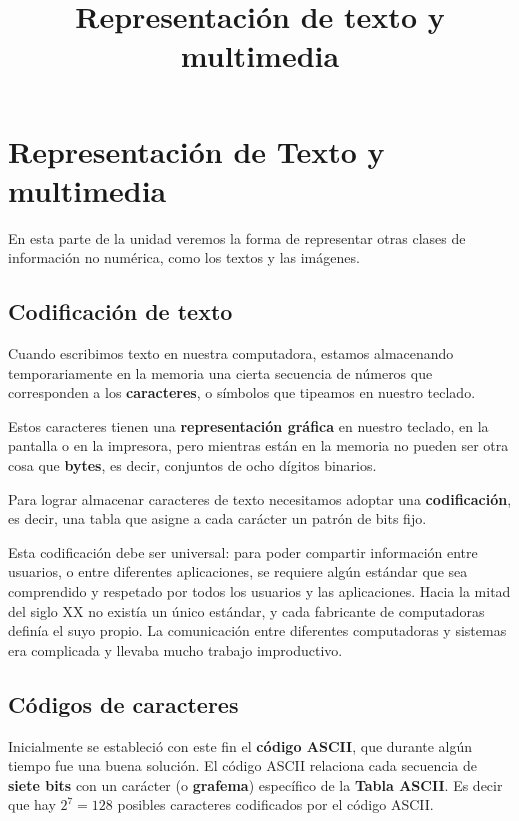\documentclass[spanish,a4paper,]{article}
\title{Representación de texto y multimedia}
\date{}
\begin{document}
\maketitle

\hypertarget{representaciuxf3n-de-texto-y-multimedia}{%
\section{Representación de Texto y
multimedia}\label{representaciuxf3n-de-texto-y-multimedia}}

En esta parte de la unidad veremos la forma de representar otras clases
de información no numérica, como los textos y las imágenes.

\hypertarget{codificaciuxf3n-de-texto}{%
\subsection{Codificación de texto}\label{codificaciuxf3n-de-texto}}

Cuando escribimos texto en nuestra computadora, estamos almacenando
temporariamente en la memoria una cierta secuencia de números que
corresponden a los \textbf{caracteres}, o símbolos que tipeamos en
nuestro teclado.

Estos caracteres tienen una \textbf{representación gráfica} en nuestro
teclado, en la pantalla o en la impresora, pero mientras están en la
memoria no pueden ser otra cosa que \textbf{bytes}, es decir, conjuntos
de ocho dígitos binarios.

Para lograr almacenar caracteres de texto necesitamos adoptar una
\textbf{codificación}, es decir, una tabla que asigne a cada carácter un
patrón de bits fijo.

Esta codificación debe ser universal: para poder compartir información
entre usuarios, o entre diferentes aplicaciones, se requiere algún
estándar que sea comprendido y respetado por todos los usuarios y las
aplicaciones. Hacia la mitad del siglo XX no existía un único estándar,
y cada fabricante de computadoras definía el suyo propio. La
comunicación entre diferentes computadoras y sistemas era complicada y
llevaba mucho trabajo improductivo.

\hypertarget{cuxf3digos-de-caracteres}{%
\subsection{Códigos de caracteres}\label{cuxf3digos-de-caracteres}}

Inicialmente se estableció con este fin el \textbf{código ASCII}, que
durante algún tiempo fue una buena solución. El código ASCII relaciona
cada secuencia de \textbf{siete bits} con un carácter (o
\textbf{grafema}) específico de la \textbf{Tabla ASCII}. Es decir que
hay \(2^7 = 128\) posibles caracteres codificados por el código ASCII.
\end{document}

